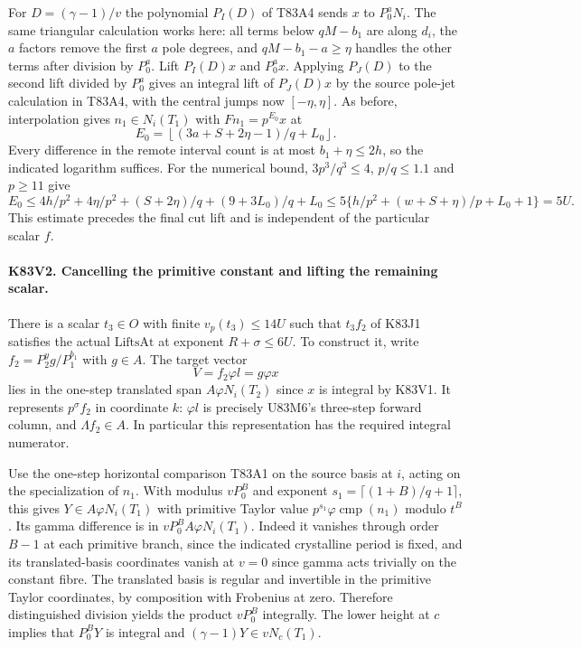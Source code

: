 For $D=(\gamma-1)/v$ the polynomial $P_I(D)$ of T83A4 sends $x$
to $P_0^aN_i$. The same triangular calculation works here:
all terms below $qM-b_1$ are along $d_i$, the $a$ factors remove
the first $a$ pole degrees, and $qM-b_1-a\ge\eta$ handles the
other terms after division by $P_0^a$. Lift $P_I(D)x$ and
$P_0^a x$. Applying $P_J(D)$ to the second lift divided by
$P_0^a$ gives an integral lift of $P_J(D)x$ by the source
pole-jet calculation in T83A4, with the central jumps now
$[-\eta,\eta]$. As before, interpolation gives
$n_1\in N_i(T_1)$ with $Fn_1=p^{E_0}x$ at
\[
 E_0=\left\lfloor(3a+S+2\eta-1)/q+L_0\right\rfloor.
\]
Every difference in the remote interval count is at most
$b_1+\eta\le2h$, so the indicated logarithm suffices. For the
numerical bound, $3p^3/q^3\le4$, $p/q\le1.1$ and $p\ge11$ give
\[
 E_0\le 4h/p^2+4\eta/p^2+(S+2\eta)/q+
                     (9+3L_0)/q+L_0
       \le 5\{h/p^2+(w+S+\eta)/p+L_0+1\}=5U.
\]
This estimate precedes the final cut lift and is independent of
the particular scalar $f$.

\paragraph{K83V2. Cancelling the primitive constant and lifting the remaining scalar.}
There is a scalar $t_3\in O$ with finite $v_p(t_3)\le14U$ such
that $t_3f_2$ of K83J1 satisfies the actual $\mathrm{LiftsAt}$
at exponent $R+\sigma\le6U$. To construct it, write
$f_2=P_2^y g/P_1^{b_1}$ with $g\in A$. The target vector
\[
              V=f_2\varphi l=g\varphi x
\]
lies in the one-step translated span $A\varphi N_i(T_2)$ since
$x$ is integral by K83V1. It represents $p^\sigma f_2$ in
coordinate $k$: $\varphi l$ is precisely U83M6's three-step
forward column, and $\Lambda f_2\in A$. In particular this
representation has the required integral numerator.

Use the one-step horizontal comparison T83A1 on the source basis
at $i$, acting on the specialization of $n_1$. With modulus
$vP_0^B$ and exponent $s_1=\lceil(1+B)/q+1\rceil$, this gives
$Y\in A\varphi N_i(T_1)$ with primitive Taylor value
$p^{s_1}\varphi\operatorname{cmp}(n_1)$ modulo $t^B$. Its
gamma difference is in $vP_0^B A\varphi N_i(T_1)$.
Indeed it vanishes through order $B-1$ at each primitive branch,
since the indicated crystalline period is fixed, and its
translated-basis coordinates vanish at $v=0$ since gamma acts
trivially on the constant fibre. The translated basis is regular
and invertible in the primitive Taylor coordinates, by composition
with Frobenius at zero. Therefore distinguished division yields
the product $vP_0^B$ integrally. The lower height at $c$ implies
that $P_0^B Y$ is integral and $(\gamma-1)Y\in vN_c(T_1)$.

